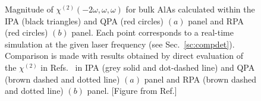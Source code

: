 \begin{figure}[ht]
\centering
{}
\caption{\footnotesize{Magnitude of $\chi^{(2)}(-2\omega,\omega,\omega)$ for bulk AlAs calculated within the IPA (black triangles) and QPA (red circles) $(a)$ panel and RPA (red circles) $(b)$ panel. Each point corresponds to a real-time simulation at the given laser frequency (see Sec.~\ref{sc:compdet}). Comparison is made with results obtained \ai by direct evaluation of the $\chi^{(2)}$ in Refs.~\cite{PhysRevB.82.235201,PSSB.427.1984} in IPA (grey solid and dot-dashed line) and QPA (brown dashed and dotted line) $(a)$ panel and RPA (brown dashed and dotted line) $(b)$ panel. \label{fg:AlAsQPRPA} [Figure from Ref.\cite{nloptics2013}] }}
\end{figure}

